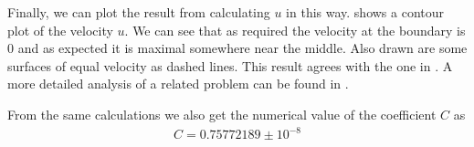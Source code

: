 \documentclass[10pt,a4paper,twocolumn]{article}
\begin{document}
Finally, we can plot the result from calculating $u$ in this way.  shows a contour plot of the velocity $u$. We can see that as required the velocity at the boundary is $0$ and as expected it is maximal somewhere near the middle. Also drawn are some surfaces of equal velocity as dashed lines. This result agrees with the one in \cite{alassar}. A more detailed analysis of a related problem can be found in \cite{ELSAMNI20191}.

From the same calculations we also get the numerical value of the coefficient $C$ as
%
\begin{align}
    C = 0.75772189 \pm 10^{-8}
\end{align}








\printbibliography
\end{document}
